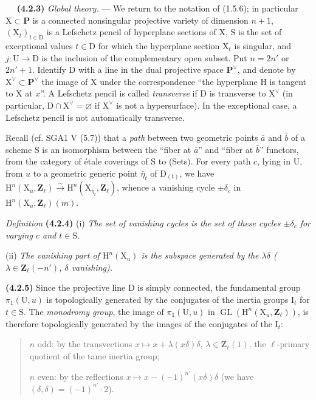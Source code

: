 \documentclass[11pt,leqno]{article}
\newcommand{\Page}[1]{\ifvmode\noindent\else\unskip\ \fi{\footnotesize\textcolor{gray}{[p.\,#1]}}\ \ignorespaces}
\begin{document}
\Page{220}
\textbf{(4.2.3)} \textit{Global theory.} — We return to the notation of (1.5.6); in particular \(\mathrm{X}\subset\mathbf{P}\) is a connected nonsingular projective variety of dimension \(n+1\), \((\mathrm{X}_t)_{t\in\mathrm{D}}\) is a Lefschetz pencil of hyperplane sections of \(\mathrm{X}\), \(\mathrm{S}\) is the set of exceptional values \(t\in\mathrm{D}\) for which the hyperplane section \(\mathrm{X}_t\) is singular, and \(j:\mathrm{U}\to\mathrm{D}\) is the inclusion of the complementary open subset. Put \(n=2n'\) or \(2n'+1\). Identify \(\mathrm{D}\) with a line in the dual projective space \(\mathbf{P}^{\vee}\), and denote by \(\mathrm{X}^{\vee}\subset\mathbf{P}^{\vee}\) the image of \(\mathrm{X}\) under the correspondence “the hyperplane \(\mathrm{H}\) is tangent to \(\mathrm{X}\) at \(x\)”. A Lefschetz pencil is called \textit{transverse} if \(\mathrm{D}\) is transverse to \(\mathrm{X}^{\vee}\) (in particular, \(\mathrm{D}\cap\mathrm{X}^{\vee}=\varnothing\) if \(\mathrm{X}^{\vee}\) is not a hypersurface). In the exceptional case, a Lefschetz pencil is not automatically transverse.

Recall (cf. SGA1 V (5.7)) that a \textit{path} between two geometric points \(\bar a\) and \(\bar b\) of a scheme \(\mathrm{S}\) is an isomorphism between the “fiber at \(\bar a\)” and “fiber at \(\bar b\)” functors, from the category of étale coverings of \(\mathrm{S}\) to (Sets). For every path \(c\), lying in \(\mathrm{U}\), from \(u\) to a geometric generic point \(\bar\eta_t\) of \(\mathrm{D}_{(t)}\), we have \(\mathrm{H}^n(\mathrm{X}_u,\mathbf{Z}_\ell)\xrightarrow{\sim}\mathrm{H}^n(\mathrm{X}_{\bar\eta_t},\mathbf{Z}_\ell)\), whence a vanishing cycle \(\pm\delta_c\) in \(\mathrm{H}^n(\mathrm{X}_u,\mathbf{Z}_\ell)(m)\).

\textit{Definition} \textbf{(4.2.4)} (i) \textit{The set of \textup{vanishing cycles} is the set of these cycles \(\pm\delta_c\) for varying \(c\) and \(t\in\mathrm{S}\).}

(ii) \textit{The \textup{vanishing part} of \(\mathrm{H}^n(\mathrm{X}_u)\) is the subspace generated by the \(\lambda\delta\) (\(\lambda\in\mathbf{Z}_\ell(-n')\), \(\delta\) vanishing).}

\textbf{(4.2.5)} Since the projective line \(\mathrm{D}\) is simply connected, the fundamental group \(\pi_1(\mathrm{U},u)\) is topologically generated by the conjugates of the inertia groups \(\mathrm{I}_t\) for \(t\in\mathrm{S}\). The \textit{monodromy group}, the image of \(\pi_1(\mathrm{U},u)\) in \(\operatorname{GL}(\mathrm{H}^n(\mathrm{X}_u,\mathbf{Z}_\ell))\), is therefore topologically generated by the images of the conjugates of the \(\mathrm{I}_t\):
\begin{quote}
\(n\) odd: by the transvections \(x\mapsto x+\lambda(x\delta)\delta\), \(\lambda\in\mathbf{Z}_\ell(1)\), the \(\ell\)-primary quotient of the tame inertia group;

\(n\) even: by the reflections \(x\mapsto x-(-1)^{n'}(x\delta)\delta\) (we have \((\delta,\delta)=(-1)^{n'}\cdot2\)).
\end{quote}
\end{document}
